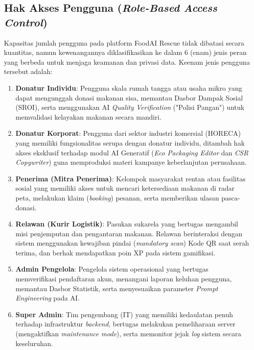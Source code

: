\subsection{Hak Akses Pengguna (\textit{Role-Based Access Control})}

Kapasitas jumlah pengguna pada platform FoodAI Rescue tidak dibatasi secara kuantitas, namun kewenangannya diklasifikasikan ke dalam 6 (enam) jenis peran yang berbeda untuk menjaga keamanan dan privasi data. Keenam jenis pengguna tersebut adalah:

\begin{enumerate}[label=\arabic*.]
    \item \textbf{Donatur Individu}: Pengguna skala rumah tangga atau usaha mikro yang dapat mengunggah donasi makanan sisa, memantau Dasbor Dampak Sosial (SROI), serta menggunakan AI \textit{Quality Verification} ("Polisi Pangan") untuk memvalidasi kelayakan makanan secara mandiri.
    \item \textbf{Donatur Korporat}: Pengguna dari sektor industri komersial (HORECA) yang memiliki fungsionalitas serupa dengan donatur individu, ditambah hak akses eksklusif terhadap modul AI Generatif (\textit{Eco Packaging Editor} dan \textit{CSR Copywriter}) guna memproduksi materi kampanye keberlanjutan perusahaan.
    \item \textbf{Penerima (Mitra Penerima)}: Kelompok masyarakat rentan atau fasilitas sosial yang memiliki akses untuk mencari ketersediaan makanan di radar peta, melakukan klaim (\textit{booking}) pesanan, serta memberikan ulasan pasca-donasi.
    \item \textbf{Relawan (Kurir Logistik)}: Pasukan sukarela yang bertugas mengambil misi penjemputan dan pengantaran makanan. Relawan berinteraksi dengan sistem menggunakan kewajiban pindai (\textit{mandatory scan}) Kode QR saat serah terima, dan berhak mendapatkan poin XP pada sistem gamifikasi.
    \item \textbf{Admin Pengelola}: Pengelola sistem operasional yang bertugas memverifikasi pendaftaran akun, menangani laporan keluhan pengguna, memantau Dasbor Statistik, serta menyesuaikan parameter \textit{Prompt Engineering} pada AI.
    \item \textbf{Super Admin}: Tim pengembang (IT) yang memiliki kedaulatan penuh terhadap infrastruktur \textit{backend}, bertugas melakukan pemeliharaan server (mengaktifkan \textit{maintenance mode}), serta memonitor jejak \textit{log} sistem secara keseluruhan.
\end{enumerate}

